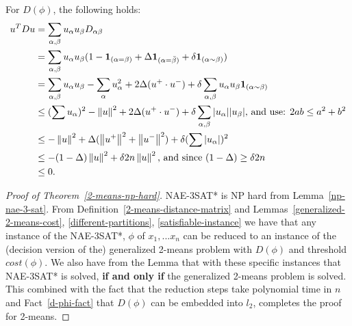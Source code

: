 \begin{fact} \label{d-phi-fact}
For $D(\phi)$, the following holds:
\begin{align*}
u^TDu &= \sum_{\alpha, \beta} u_\alpha u_\beta D_{\alpha \beta}\\ 
&=\sum_{\alpha, \beta} u_\alpha u_\beta (1 - \mathbf{1}_{(\alpha =
  \beta)} + \Delta\mathbf{1}_{(\alpha = \bar{\beta})} + \delta
\mathbf{1}_{(\alpha \sim \beta)})\\ 
&=\sum_{\alpha, \beta} u_\alpha u_\beta - \sum_{\alpha} u_\alpha^2
+2\Delta (u^+ \cdot u^-) + \delta \sum_{\alpha, \beta} u_\alpha
u_\beta \mathbf{1}_{(\alpha \sim \beta)}\\ 
& \le (\sum u_\alpha)^2  - \left\lVert u\right\rVert^2 + 2\Delta (u^+ \cdot u^-) +
\delta \sum_{\alpha, \beta} |u_\alpha| |u_\beta| \text{,  and use:
  $2ab \le a^2 + b^2$}\\  
& \le - \left\lVert u\right\rVert^2 + \Delta (\left\lVert u^+\right\rVert^2  + \left\lVert u^-\right\rVert^2) + \delta
(\sum |u_\alpha|)^2 \\ 
& \le -(1- \Delta) \left\lVert u\right\rVert^2  + \delta 2n \left\lVert u\right\rVert^2  \text{,  and
  since $(1- \Delta) \ge \delta 2n$} \\ 
& \le 0.
\end{align*}
\end{fact}


\begin{proof}[Proof of Theorem~\ref{2-means-np-hard}]
NAE-3SAT* is NP hard from Lemma~\ref{np-nae-3-sat}.  From
Definition~\ref{2-means-distance-matrix} and
Lemmas~\ref{generalized-2-means-cost}, \ref{different-partitions},
\ref{satisfiable-instance} we have that any instance of the NAE-3SAT*,
$\phi$ of $x_1,...x_n$ can be reduced to an instance of the (decision
version of the) generalized 2-means problem with $D(\phi)$ and
threshold $cost(\phi)$.  We also have from the Lemma that with these
specific instances that NAE-3SAT* is solved, \textbf{if and only if}
the generalized 2-means problem is solved.  This combined with the
fact that the reduction steps take polynomial time in $n$ and
Fact~\ref{d-phi-fact} that $D(\phi)$ can be embedded into $l_2$,
completes the proof for 2-means. 
\end{proof}




